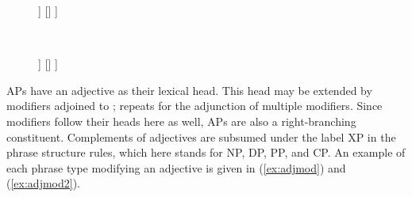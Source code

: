 \begin{figure}
\ex{}\label{ex:adjpcstruct}
\begin{minipage}[t]{.5\remaining}
\tl\quad%
\begin{forest}
[{\anno[\elem{\Adjc} $\vee$ \pass{\Plink}]{AP}}
	[\anno{\xbar{A}}
		[\anno{\xhead{A}}]
		[{\anno[\pass{\GF}]{XP}}]
	]
	[{}]
]
\end{forest}
\end{minipage}
~
\begin{minipage}[t]{.5\remaining}
\tl\quad%
\begin{forest}
[{\anno[\elem{\Adjc} $\vee$ \pass{\Plink}]{AP}}
	[\anno{AP}
		[\anno{\xhead{A}}]
		[{\anno[\elem{\Adjc}]{AdvP}}]
	]
	[{}]
]
\end{forest}
\end{minipage}
\xe
\end{figure}

APs have an adjective as their lexical head. This head may be extended by
modifiers adjoined to ;  repeats for the
adjunction of multiple modifiers. Since
modifiers follow their heads here as well, APs are also a
right-branching constituent. Complements of adjectives are subsumed under the
label XP in the phrase structure rules, which here stands for NP, DP, PP, and CP. An
example of each phrase type modifying an adjective is given in (\ref{ex:adjmod})
and (\ref{ex:adjmod2}).


